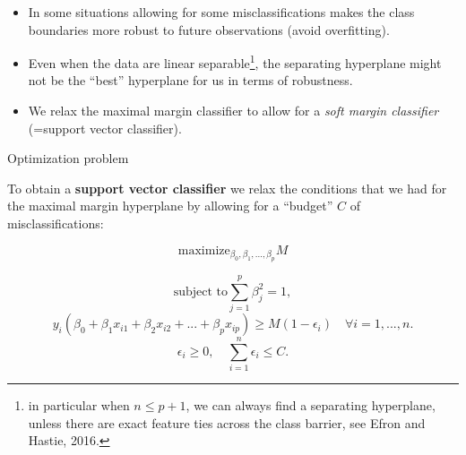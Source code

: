 \documentclass[10pt,ignorenonframetext,]{beamer}
\begin{document}
\begin{frame}

\begin{itemize}
\item
  In some situations allowing for some misclassifications makes the
  class boundaries more robust to future observations (avoid
  overfitting).
\item
  Even when the data are linear
  separable\footnote{in particular when $n\leq p+1$, we can always find a separating hyperplane, unless there are exact feature ties across the class barrier, see Efron and Hastie, 2016.},
  the separating hyperplane might not be the ``best'' hyperplane for us
  in terms of robustness.
\item
  We relax the maximal margin classifier to allow for a \emph{soft
  margin classifier} (=support vector classifier).
\end{itemize}

\end{frame}

\begin{frame}

\begin{block}{Optimization problem}

\vspace{2mm}

To obtain a \textbf{support vector classifier} we relax the conditions
that we had for the maximal margin hyperplane by allowing for a
``budget'' \(C\) of misclassifications: \vspace{2mm}

\[\mathrm{maximize}_{\beta_0,\beta_1,...,\beta_p}  M \]

\[\text{subject to} \sum_{j=1}^p \beta_j^2=1,\]
\[y_i(\beta_0+\beta_1 x_{i1}+\beta_2 x_{i2}+...+\beta_p x_{ip})\geq M(1-\epsilon_i) \quad  \forall i=1,...,n.\]
\[\epsilon_i\geq 0, \quad \sum_{i=1}^n \epsilon_i \leq C.\]

\end{block}

\end{frame}
\end{document}
